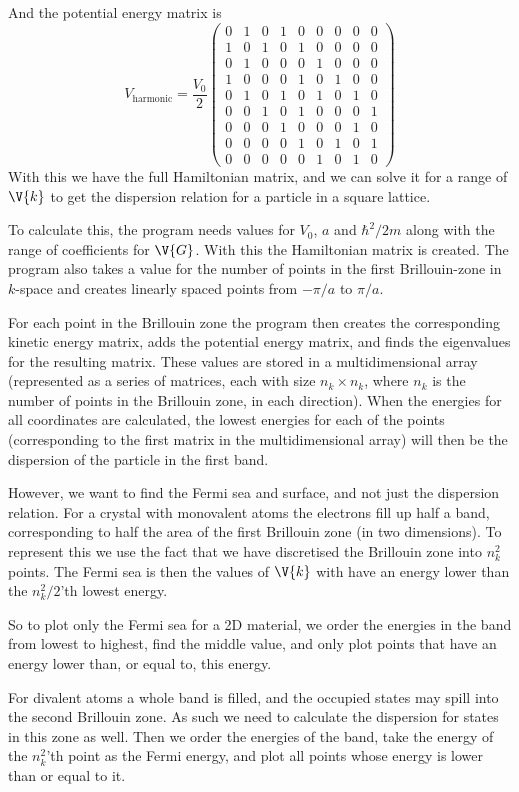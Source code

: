 \documentclass[main.tex]{subfiles}
\begin{document}
	And the potential energy matrix is
	\begin{equation}
		V_{\text{harmonic}} = \frac{V_0}{2} \begin{pmatrix}
		0 & 1 & 0 & 1 & 0 & 0 & 0 & 0 & 0 \\
		1 & 0 & 1 & 0 & 1 & 0 & 0 & 0 & 0 \\
		0 & 1 & 0 & 0 & 0 & 1 & 0 & 0 & 0 \\
		1 & 0 & 0 & 0 & 1 & 0 & 1 & 0 & 0 \\
		0 & 1 & 0 & 1 & 0 & 1 & 0 & 1 & 0 \\
		0 & 0 & 1 & 0 & 1 & 0 & 0 & 0 & 1 \\
		0 & 0 & 0 & 1 & 0 & 0 & 0 & 1 & 0 \\
		0 & 0 & 0 & 0 & 1 & 0 & 1 & 0 & 1 \\
		0 & 0 & 0 & 0 & 0 & 1 & 0 & 1 & 0
		\end{pmatrix}
	\end{equation}
	With this we have the full Hamiltonian matrix, and we can solve it for a range of $ \V{k} $ to get the dispersion relation for a particle in a square lattice.
	
	To calculate this, the program needs values for $ V_0 $, $ a $ and $ \hbar^2/2m $ along with the range of coefficients for $ \V{G} $. With this the Hamiltonian matrix is created. The program also takes a value for the number of points in the first Brillouin-zone in $ k $-space and creates linearly spaced points from $ -\pi/a $ to $ \pi/a $.
	
	For each point in the Brillouin zone the program then creates the corresponding kinetic energy matrix, adds the potential energy matrix, and finds the eigenvalues for the resulting matrix. These values are stored in a multidimensional array (represented as a series of matrices, each with size $ n_k \times n_k $, where $ n_k $ is the number of points in the Brillouin zone, in each direction). When the energies for all coordinates are calculated, the lowest energies for each of the points (corresponding to the first matrix in the multidimensional array) will then be the dispersion of the particle in the first band.
	
	However, we want to find the Fermi sea and surface, and not just the dispersion relation. For a crystal with monovalent atoms the electrons fill up half a band, corresponding to half the area of the first Brillouin zone (in two dimensions). To represent this we use the fact that we have discretised the Brillouin zone into $ n_k^2 $ points. The Fermi sea is then the values of $ \V{k} $ with have an energy lower than the $ n_k^2/2 $'th lowest energy.
	
	So to plot only the Fermi sea for a 2D material, we order the energies in the band from lowest to highest, find the middle value, and only plot points that have an energy lower than, or equal to, this energy.
	
	For divalent atoms a whole band is filled, and the occupied states may spill into the second Brillouin zone. As such we need to calculate the dispersion for states in this zone as well. Then we order the energies of the band, take the energy of the $ n_k^2 $'th point as the Fermi energy, and plot all points whose energy is lower than or equal to it.
	
	
\end{document}
